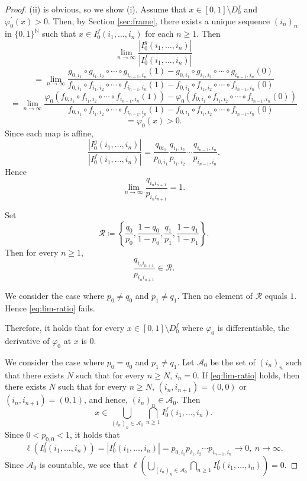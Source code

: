 \documentclass[a4paper, reqno, 11pt]{amsart}
\theoremstyle{definition}
\begin{document}
\begin{proof}
(ii) is obvious, so we show (i). 
Assume that $x\in [0,1] \setminus D^{f}_0$ and $\varphi_0^{\prime}(x) > 0$.
Then, by Section \ref{sec:frame},  there exists a unique sequence $(i_n)_n$ in $\{0,1\}^{\mathbb N}$ such that $x \in I^{f}_{0} (i_1, \dots, i_n)$ for each $n \ge 1$. 
Then
\[ \lim_{n \to \infty} \frac{|I^{g}_{0} (i_1, \dots, i_n)|}{|I^{f}_{0} (i_1, \dots, i_n)|}  \]
\[ = \lim_{n \to \infty} \frac{g_{0, i_1} \circ g_{i_1, i_2} \circ \cdots \circ g_{i_{n-1}, i_n} (1) - g_{0, i_1} \circ g_{i_1, i_2} \circ \cdots \circ g_{i_{n-1}, i_n} (0)}{f_{0, i_1} \circ f_{i_1, i_2} \circ \cdots \circ f_{i_{n-1}, i_n} (1) - f_{0, i_1} \circ f_{i_1, i_2} \circ \cdots \circ f_{i_{n-1}, i_n} (0)} \]
\[ = \lim_{n \to \infty} \frac{\varphi_0 \left( f_{0, i_1} \circ f_{i_1, i_2} \circ \cdots \circ f_{i_{n-1}, i_n} (1) \right) - \varphi_0 \left( f_{0, i_1} \circ f_{i_1, i_2} \circ \cdots \circ f_{i_{n-1}, i_n} (0) \right)}{f_{0, i_1} \circ f_{i_1, i_2} \circ \cdots \circ f_{i_{n-1}, i_n} (1) - f_{0, i_1} \circ f_{i_1, i_2} \circ \cdots \circ f_{i_{n-1}, i_n} (0)} \]
\[ = \varphi_0^{\prime}(x) > 0.  \]
Since each map is affine, 
\[ \frac{|I^{g}_{0} (i_1, \dots, i_n)|}{|I^{f}_{0} (i_1, \dots, i_n)|} = \frac{q_{0 i_1}}{p_{0,i_1}} \frac{q_{i_1, i_2}}{p_{i_1, i_2}} \cdots \frac{q_{i_{n-1}, i_{n}}}{p_{i_{n-1}, i_n}}. \]
Hence 
\begin{equation}\label{eq:lim-ratio}
\lim_{n \to \infty} \frac{q_{i_{n} i_{n+1}}}{p_{i_{n} i_{n+1}}} = 1. 
\end{equation}

Set 
\[ \mathscr{R} \coloneqq \left\{\frac{q_{0}}{p_{0}}, \frac{1-q_{0}}{1-p_{0}}, \frac{q_{1}}{p_{1}}, \frac{1 - q_{1}}{1 - p_{1}}   \right\}. \]
Then for every $n \ge 1$, 
\[ \frac{q_{i_{n} i_{n+1}}}{p_{i_{n} i_{n+1}}}  \in \mathscr{R}. \]

We consider the case where $p_0 \ne q_0$ and $p_1 \ne q_1$. 
Then no element of $\mathscr{R}$ equals $1$. 
Hence \eqref{eq:lim-ratio} fails. 


Therefore, it holds that  for every $x\in [0,1] \setminus D^{f}_0$ where $\varphi_0$ is differentiable, 
the derivative of $\varphi_0$ at $x$ is $0$. 

We consider the case where $p_0 = q_0$ and $p_1 \ne q_1$. 
Let $\mathcal{A}_0$ be the set of $(i_n)_n$ such that there exists $N$ such that for every $n \ge N$, $i_n = 0$.
If \eqref{eq:lim-ratio} holds, then there exists $N$ such that for every $n \ge N$, $(i_n, i_{n+1}) = (0,0)$ or $(i_n, i_{n+1}) = (0,1)$, and hence, $(i_n)_n \in \mathcal{A}_0$. 
Then 
\[ x \in \bigcup_{(i_n)_n \in \mathcal{A}_0} \bigcap_{n \ge 1} I^{f}_{0} (i_1, \dots, i_n).  \]
Since $0 < p_{0,0} < 1$, it holds that 
\[ \ell \left( I^{f}_{0} (i_1, \dots, i_n) \right) = \left| I^{f}_{0} (i_1, \dots, i_n) \right| = p_{0, i_1} p_{i_1, i_2} \cdots p_{i_{n-1}, i_n} \to 0, \ n \to \infty. \]
Since $\mathcal{A}_0$ is countable,  
we see that $\displaystyle \ell \left( \bigcup_{(i_n)_n \in \mathcal{A}_0} \bigcap_{n \ge 1} I^{f}_{0} (i_1, \dots, i_n)  \right) = 0$.


\end{proof}
\end{document}
